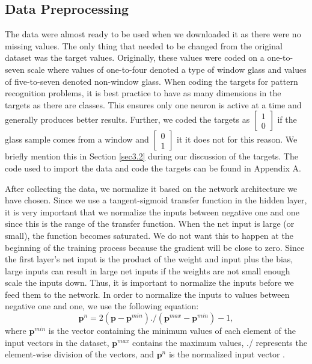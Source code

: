 \documentclass[12pt,halfline,a4paper]{ouparticle}
\begin{document}
\subsection{Data Preprocessing}
\label{sec5.1}
The data were almost ready to be used when we downloaded it as there were no missing values. The only thing that needed to be changed from the original dataset was the target values. Originally, these values were coded on a one-to-seven scale where values of one-to-four denoted a type of window glass and values of five-to-seven denoted non-window glass. When coding the targets for pattern recognition problems, it is best practice to have as many dimensions in the targets as there are classes. This ensures only one neuron is active at a time and generally produces better results. Further, we coded the targets as $\begin{bmatrix} 1 \\ 0 \end{bmatrix}$ if the glass sample comes from a window and $\begin{bmatrix} 0 \\ 1 \end{bmatrix}$ it it does not for this reason. We briefly mention this in Section \ref{sec3.2} during our discussion of the targets. The code used to import the data and code the targets can be found in Appendix A. 

After collecting the data, we normalize it based on the network architecture we have chosen. Since we use a tangent-sigmoid transfer function in the hidden layer, it is very important that we normalize the inputs between negative one and one since this is the range of the transfer function. When the net input is large (or small), the function becomes saturated. We do not want this to happen at the beginning of the training process because the gradient will be close to zero. Since the first layer's net input is the product of the weight and input plus the bias, large inputs can result in large net inputs if the weights are not small enough scale the inputs down. Thus, it is important to normalize the inputs before we feed them to the network. In order to normalize the inputs to values between negative one and one, we use the following equation: 
\begin{equation}
\mathbf{p}^{n} = 2(\mathbf{p}-\mathbf{p}^{min}) ./ (\mathbf{p}^{max}-\mathbf{p}^{min}) - 1,
\end{equation}
where $\mathbf{p}^{min}$ is the vector containing the minimum values of each element of the input vectors in the dataset, $\mathbf{p}^{max}$ contains the maximum values, ./ represents the element-wise division of the vectors, and $\mathbf{p}^{n}$ is the normalized input vector \cite{hagan2014}. 
\end{document}
